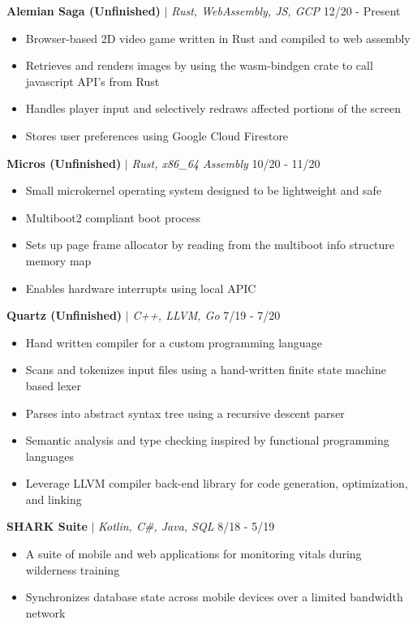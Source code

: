 \documentclass{article}
\newcommand{\project}[3]{\textbf{#1} $|$ \textit{#2} \hfill #3}
\newcommand{\makeListInner}[1]{\begin{itemize}[noitemsep,topsep=0pt] #1 \end{itemize}}
\newcommand{\makeList}[1]{\makeListInner{#1} \medskip}
\begin{document}
    \medskip

    \project{Alemian Saga (Unfinished)}{Rust, WebAssembly, JS, GCP}{12/20 - Present} \makeList{
        \item Browser-based 2D video game written in Rust and compiled to web assembly
        \item Retrieves and renders images by using the wasm-bindgen crate to call javascript API's from Rust
        \item Handles player input and selectively redraws affected portions of the screen
        \item Stores user preferences using Google Cloud Firestore
    }

    \project{Micros (Unfinished)}{Rust, x86\_64 Assembly}{10/20 - 11/20} \makeList {
        \item Small microkernel operating system designed to be lightweight and safe
        \item Multiboot2 compliant boot process
        \item Sets up page frame allocator by reading from the multiboot info structure memory map
        \item Enables hardware interrupts using local APIC
    }

    \project{Quartz (Unfinished)}{C++, LLVM, Go}{7/19 - 7/20} \makeList {
        \item Hand written compiler for a custom programming language
        \item Scans and tokenizes input files using a hand-written finite state machine based lexer
        \item Parses into abstract syntax tree using a recursive descent parser
        \item Semantic analysis and type checking inspired by functional programming languages
        \item Leverage LLVM compiler back-end library for code generation, optimization, and linking
    }

    \project{SHARK Suite}{Kotlin, C\#, Java, SQL}{8/18 - 5/19} \makeList {
        \item A suite of mobile and web applications for monitoring vitals during wilderness training
        \item Synchronizes database state across mobile devices over a limited bandwidth network
    }
\end{document}
